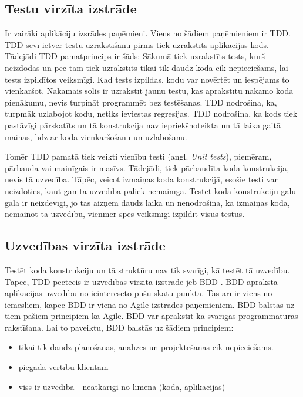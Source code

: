 
\subsection{Testu virzīta izstrāde}
Ir vairāki aplikāciju izsrādes paņēmieni. Viens no šādiem paņēmieniem ir TDD. TDD sevī ietver testu uzrakstīšanu pirms tiek uzrakstīts aplikācijas kods. Tādejādi TDD pamatprincips ir šāds: Sākumā tiek uzrakstīts tests, kurš neizdodas un pēc tam tiek uzrakstīts tikai tik daudz koda cik nepieciešams, lai tests izpildītos veiksmīgi. Kad tests izpildas, kodu var novērtēt un iespējams to vienkāršot. Nākamais solis ir uzrakstīt jaunu testu, kas aprakstītu nākamo koda pienākumu, nevis turpināt programmēt bez testēšanas. TDD nodrošina, ka, turpmāk uzlabojot kodu, netiks ieviestas regresijas. TDD nodrošina, ka kods tiek pastāvīgi pārskatīts un tā konstrukcija nav iepriekšnoteikta un tā laika gaitā mainās, līdz ar koda vienkāršošanu un uzlabošanu.

Tomēr TDD pamatā tiek veikti vienību testi (angl. \textit{Unit tests}), piemēram, pārbauda vai mainīgais ir masīvs. Tādejādi, tiek pārbaudīta koda konstrukcija, nevis tā uzvedība. Tāpēc, veicot izmaiņas koda konstrukcijā, esošie testi var neizdoties, kaut gan tā uzvedība paliek nemainīga. Testēt koda konstrukciju galu galā ir neizdevīgi, jo tas aizņem daudz laika un nenodrošina, ka izmaiņas kodā, nemainot tā uzvedību, vienmēr spēs veiksmīgi izpildīt visus testus. \cite[1. nodaļa]{chelimsky2010Rspec}

\subsection{Uzvedības virzīta izstrāde}
Testēt koda konstrukciju un tā struktūru nav tik svarīgi, kā testēt tā uzvedību. Tāpēc, TDD pēctecis ir uzvedības virzīta izstrāde jeb BDD . BDD apraksta aplikācijas uzvedību no ieinteresēto pušu skatu punkta. Tas arī ir viens no iemesliem, kāpēc BDD ir viena no Agile izstrādes paņēmieniem. BDD balstās uz tiem pašiem principiem kā Agile.
BDD var aprakstīt kā svarīgas programmatūras rakstīšana. Lai to paveiktu, BDD balstās uz šādiem principiem:
\begin{itemize}
	\item tikai tik daudz plānošanas, analīzes un projektēšanas cik nepieciešams.
	\item piegādā vērtību klientam
	\item viss ir uzvedība - neatkarīgi no līmeņa (koda, aplikācijas)
\end{itemize}
\cite[11. nodaļa]{chelimsky2010Rspec}


